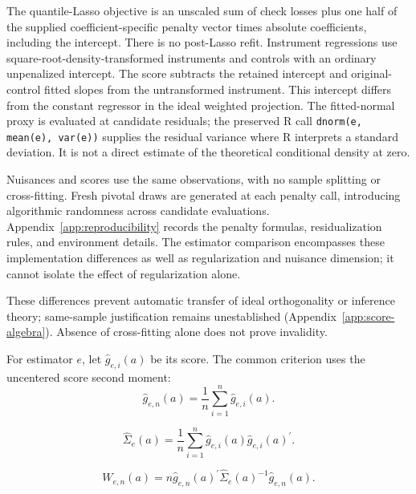 The quantile-Lasso objective is an unscaled sum of check losses plus one half of the supplied coefficient-specific penalty vector times absolute coefficients, including the intercept. There is no post-Lasso refit. Instrument regressions use square-root-density-transformed instruments and controls with an ordinary unpenalized intercept. The score subtracts the retained intercept and original-control fitted slopes from the untransformed instrument. This intercept differs from the constant regressor in the ideal weighted projection. The fitted-normal proxy is evaluated at candidate residuals; the preserved R call \texttt{dnorm(e, mean(e), var(e))} supplies the residual variance where R interprets a standard deviation. It is not a direct estimate of the theoretical conditional density at zero.

Nuisances and scores use the same observations, with no sample splitting or cross-fitting. Fresh pivotal draws are generated at each penalty call, introducing algorithmic randomness across candidate evaluations. Appendix~\ref{app:reproducibility} records the penalty formulas, residualization rules, and environment details. The estimator comparison encompasses these implementation differences as well as regularization and nuisance dimension; it cannot isolate the effect of regularization alone.

These differences prevent automatic transfer of ideal orthogonality or inference theory; same-sample justification remains unestablished (Appendix~\ref{app:score-algebra}). Absence of cross-fitting alone does not prove invalidity.

For estimator $e$, let $\widehat g_{e,i}(a)$ be its score. The common criterion uses the uncentered score second moment:
\begin{equation}
    \widehat g_{e,n}(a)
    =
    \frac{1}{n}\sum_{i=1}^{n}\widehat g_{e,i}(a).
    \label{eq:sample-gmm-moment}
\end{equation}

\begin{equation}
    \widehat\Sigma_e(a)
    =
    \frac{1}{n}\sum_{i=1}^{n}
    \widehat g_{e,i}(a)\widehat g_{e,i}(a)^{\prime}.
    \label{eq:score-covariance}
\end{equation}

\begin{equation}
    W_{e,n}(a)
    =
    n\widehat g_{e,n}(a)^{\prime}
    \widehat\Sigma_e(a)^{-1}
    \widehat g_{e,n}(a).
    \label{eq:gmm-criterion}
\end{equation}


